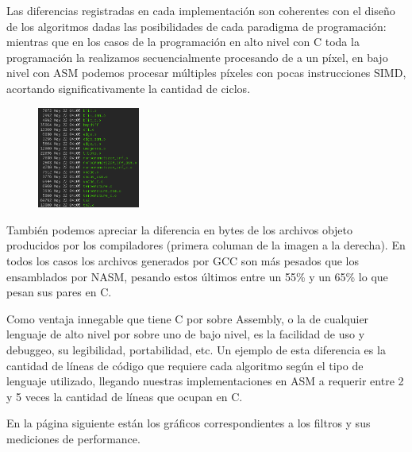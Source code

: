 Las diferencias registradas en cada implementación son coherentes con el diseño de los algoritmos dadas las posibilidades de cada paradigma de programación: mientras que en los casos de la programación en alto nivel con C toda la programación la realizamos secuencialmente procesando de a un píxel, en bajo nivel con ASM podemos procesar múltiples píxeles con pocas instrucciones SIMD, acortando significativamente la cantidad de ciclos.

\begin{figure}
	\centering
	\includegraphics[width=0.3\textwidth]{imagenes/testperformance/sizes.png}
\end{figure}

También podemos apreciar la diferencia en bytes de los archivos objeto producidos por los compiladores (primera columan de la imagen a la derecha). En todos los casos los archivos generados por GCC son más pesados que los ensamblados por NASM, pesando estos últimos entre un 55\% y un 65\% lo que pesan sus pares en C.

Como ventaja innegable que tiene C por sobre Assembly, o la de cualquier lenguaje de alto nivel por sobre uno de bajo nivel, es la facilidad de uso y debuggeo, su legibilidad, portabilidad, etc. Un ejemplo de esta diferencia es la cantidad de líneas de código que requiere cada algoritmo según el tipo de lenguaje utilizado, llegando nuestras implementaciones en ASM a requerir entre 2 y 5 veces la cantidad de líneas que ocupan en C.

En la página siguiente están los gráficos correspondientes a los filtros y sus mediciones de performance.

